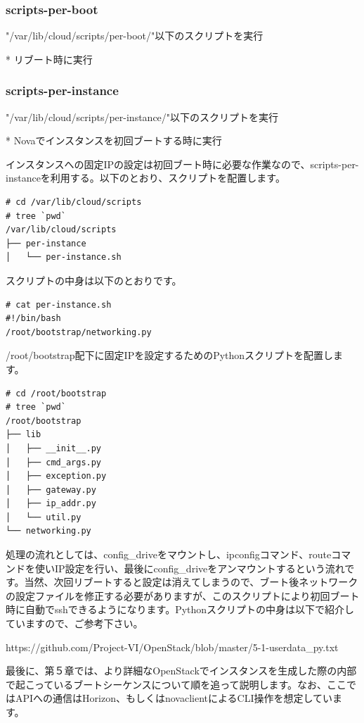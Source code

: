 \documentclass[9pt,b5paper,tombo,openany]{jsbook}
\begin{document}
\subsubsection{scripts-per-boot}

"/var/lib/cloud/scripts/per-boot/"以下のスクリプトを実行

* リブート時に実行

\subsubsection{scripts-per-instance}

"/var/lib/cloud/scripts/per-instance/"以下のスクリプトを実行

* Novaでインスタンスを初回ブートする時に実行

インスタンスへの固定IPの設定は初回ブート時に必要な作業なので、scripts-per-instanceを利用する。以下のとおり、スクリプトを配置します。

\begin{verbatim}
# cd /var/lib/cloud/scripts
# tree `pwd`
/var/lib/cloud/scripts
├── per-instance
│   └── per-instance.sh
\end{verbatim}

スクリプトの中身は以下のとおりです。

\begin{lstlisting}
# cat per-instance.sh
#!/bin/bash
/root/bootstrap/networking.py
\end{lstlisting}

/root/bootstrap配下に固定IPを設定するためのPythonスクリプトを配置します。

{\footnotesize
\begin{verbatim}
# cd /root/bootstrap
# tree `pwd`
/root/bootstrap
├── lib
│   ├── __init__.py
│   ├── cmd_args.py
│   ├── exception.py
│   ├── gateway.py
│   ├── ip_addr.py
│   └── util.py
└── networking.py
\end{verbatim}
}

処理の流れとしては、config\_driveをマウントし、ipconfigコマンド、routeコマンドを使いIP設定を行い、最後にconfig\_driveをアンマウントするという流れです。当然、次回リブートすると設定は消えてしまうので、ブート後ネットワークの設定ファイルを修正する必要がありますが、このスクリプトにより初回ブート時に自動でsshできるようになります。Pythonスクリプトの中身は以下で紹介していますので、ご参考下さい。

https://github.com/Project-VI/OpenStack/blob/master/5-1-userdata\_py.txt

最後に、第５章では、より詳細なOpenStackでインスタンスを生成した際の内部で起こっているブートシーケンスについて順を追って説明します。なお、ここではAPIへの通信はHorizon、もしくはnovaclientによるCLI操作を想定しています。
\end{document}
